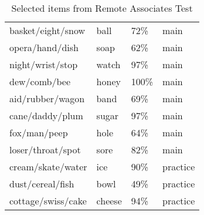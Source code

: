 \begin{table}[h!]
\begin{tabular}{llll}
		basket/eight/snow        & ball     & 72\%                                               & main  		\\ [0.5ex]
		opera/hand/dish          & soap     & 62\%                                               & main    		\\ [0.5ex]
		night/wrist/stop         & watch    & 97\%                                               & main    		\\ [0.5ex]
		dew/comb/bee             & honey    & 100\%                                              & main    		\\ [0.5ex]
		aid/rubber/wagon         & band     & 69\%                                               & main    		\\ [0.5ex]
		cane/daddy/plum          & sugar    & 97\%                                               & main    		\\ [0.5ex]
		fox/man/peep             & hole     & 64\%                                               & main    		\\ [0.5ex]
		loser/throat/spot        & sore     & 82\%                                               & main    		\\ [0.5ex]
		cream/skate/water        & ice      & 90\%                                               & practice     \\ [0.5ex]
		dust/cereal/fish         & bowl     & 49\%                                               & practice     \\ [0.5ex]
		cottage/swiss/cake       & cheese   & 94\%                                               & practice     \\ \hline
	\end{tabular}
	\caption{Selected items from Remote Associates Test \cite{Bowden}}
	\label{table:selected-remote-associates}
\end{table}

